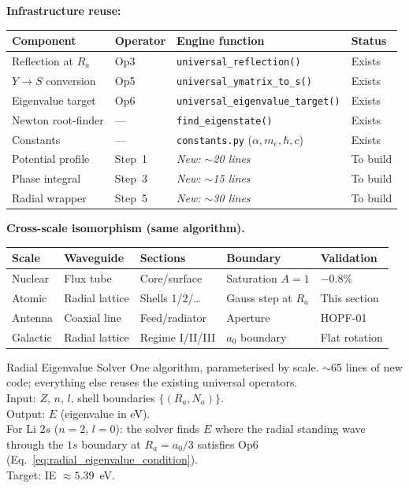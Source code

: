 \noindent\textbf{Infrastructure reuse:}
\begin{center}
\small
\renewcommand{\arraystretch}{1.2}
\begin{tabular}{llll}
\hline
\textbf{Component} & \textbf{Operator}
& \textbf{Engine function} & \textbf{Status} \\
\hline
Reflection at $R_a$ & Op3
& \texttt{universal\_reflection()} & Exists \\
$Y \to S$ conversion & Op5
& \texttt{universal\_ymatrix\_to\_s()} & Exists \\
Eigenvalue target & Op6
& \texttt{universal\_eigenvalue\_target()} & Exists \\
Newton root-finder & ---
& \texttt{find\_eigenstate()} & Exists \\
Constants & ---
& \texttt{constants.py} ($\alpha, m_e, \hbar, c$) & Exists \\
Potential profile & Step~1
& \emph{New: $\sim$20 lines} & To build \\
Phase integral & Step~3
& \emph{New: $\sim$15 lines} & To build \\
Radial wrapper & Step~5
& \emph{New: $\sim$30 lines} & To build \\
\hline
\end{tabular}
\end{center}

\noindent\textbf{Cross-scale isomorphism (same algorithm).}
\begin{center}
\small
\renewcommand{\arraystretch}{1.2}
\begin{tabular}{lllll}
\hline
\textbf{Scale} & \textbf{Waveguide}
& \textbf{Sections} & \textbf{Boundary}
& \textbf{Validation} \\
\hline
Nuclear & Flux tube
& Core/surface & Saturation $A{=}1$
& $-0.8\%$ \\
Atomic & Radial lattice
& Shells 1/2/\ldots & Gauss step at $R_a$
& This section \\
Antenna & Coaxial line
& Feed/radiator & Aperture
& HOPF-01 \\
Galactic & Radial lattice
& Regime I/II/III & $a_0$ boundary
& Flat rotation \\
\hline
\end{tabular}
\end{center}

\begin{resultbox}{Radial Eigenvalue Solver}
One algorithm, parameterised by scale.  $\sim$65 lines
of new code; everything else reuses the existing
universal operators.\\[4pt]
Input: $Z$, $n$, $l$, shell boundaries
$\{(R_a, N_a)\}$.\\
Output: $E$ (eigenvalue in eV).\\[4pt]
For Li $2s$ ($n{=}2$, $l{=}0$): the solver finds $E$
where the radial standing wave through the $1s$
boundary at $R_a = a_0/3$ satisfies Op6
(Eq.~\ref{eq:radial_eigenvalue_condition}).\\
Target: IE $\approx 5.39$~eV.
\end{resultbox}

